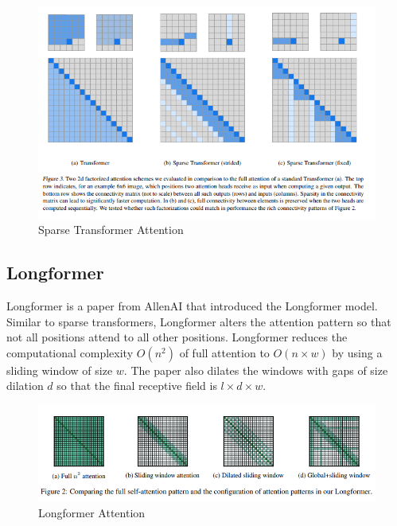 \documentclass[11pt]{article}
\theoremstyle{definition}
\begin{document}
\begin{figure}
\centering
  \includegraphics[width=\textwidth,height=\textheight,keepaspectratio]{transformers/sparse_transformer_attention.png}
  \caption{Sparse Transformer Attention \cite{child2019generating}}
  \label{fig:sparse_transformer_attention}
\end{figure}

\subsection{Longformer \cite{beltagy2020longformer}}

Longformer is a paper from AllenAI that introduced the Longformer model. Similar to sparse transformers, Longformer alters the attention pattern so that not all positions attend to all other positions. Longformer reduces the computational complexity $O(n^2)$ of full attention to $O(n \times w)$ by using a sliding window of size $w$. The paper also dilates the windows with gaps of size dilation $d$ so that the final receptive field is $l \times d \times w$.

\begin{figure}
\centering
  \includegraphics[width=\textwidth,height=\textheight,keepaspectratio]{transformers/longformer.png}
  \caption{Longformer Attention \cite{beltagy2020longformer}}
  \label{fig:longformer}
\end{figure}
\end{document}
